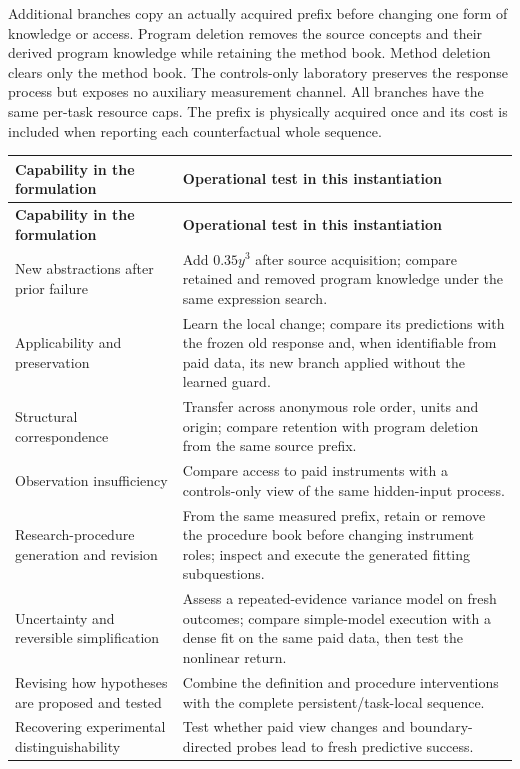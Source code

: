 \documentclass[11pt,a4paper]{article}
\begin{document}
Additional branches copy an actually acquired prefix before changing one form
of knowledge or access. Program deletion removes the source concepts and their
derived program knowledge while retaining the method book. Method deletion
clears only the method book. The controls-only laboratory preserves the response
process but exposes no auxiliary measurement channel. All branches have the
same per-task resource caps. The prefix is physically acquired once and its cost
is included when reporting each counterfactual whole sequence.


\begingroup\small\setlength{\tabcolsep}{4pt}
\renewcommand{\arraystretch}{1.18}
\begin{longtable}{@{}>{\raggedright\arraybackslash}p{}>{\raggedright\arraybackslash}p{}@{}}
\toprule
\textbf{Capability in the formulation} & \textbf{Operational test in this instantiation} \\
\midrule\endfirsthead
\toprule
\textbf{Capability in the formulation} & \textbf{Operational test in this instantiation} \\
\midrule\endhead
\bottomrule\endlastfoot
New abstractions after prior failure & Add \(0.35y^3\) after source acquisition; compare retained and removed program knowledge under the same expression search. \\
Applicability and preservation & Learn the local change; compare its predictions with the frozen old response and, when identifiable from paid data, its new branch applied without the learned guard. \\
Structural correspondence & Transfer across anonymous role order, units and origin; compare retention with program deletion from the same source prefix. \\
Observation insufficiency & Compare access to paid instruments with a controls-only view of the same hidden-input process. \\
Research-procedure generation and revision & From the same measured prefix, retain or remove the procedure book before changing instrument roles; inspect and execute the generated fitting subquestions. \\
Uncertainty and reversible simplification & Assess a repeated-evidence variance model on fresh outcomes; compare simple-model execution with a dense fit on the same paid data, then test the nonlinear return. \\
Revising how hypotheses are proposed and tested & Combine the definition and procedure interventions with the complete persistent/task-local sequence. \\
Recovering experimental distinguishability & Test whether paid view changes and boundary-directed probes lead to fresh predictive success. \\
\end{longtable}
\endgroup
\end{document}
